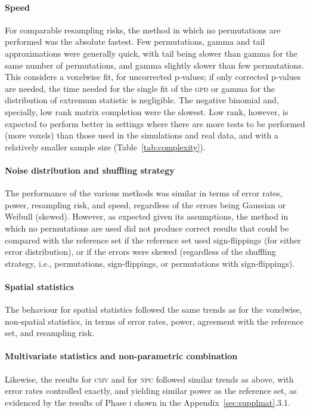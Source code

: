 \paragraph{Speed} For comparable resampling risks, the method in which no permutations are performed was the absolute fastest. Few permutations, gamma and tail approximations were generally quick, with tail being slower than gamma for the same number of permutations, and gamma slightly slower than few permutations. This considers a voxelwise fit, for uncorrected p-values; if only corrected p-values are needed, the time needed for the single fit of the \textsc{gpd} or gamma for the distribution of extremum statistic is negligible. The negative binomial and, specially, low rank matrix completion were the slowest. Low rank, however, is expected to perform better in settings where there are more tests to be performed (more voxels) than those used in the simulations and real data, and with a relatively smaller sample size (Table~\ref{tab:complexity}).

\paragraph{Noise distribution and shuffling strategy} The performance of the various methods was similar in terms of error rates, power, resampling risk, and speed, regardless of the errors being Gaussian or Weibull (skewed). However, as expected given its assumptions, the method in which no permutations are used did not produce correct results that could be compared with the reference set if the reference set used sign-flippings (for either error distribution), or if the errors were skewed (regardless of the shuffling strategy, i.e., permutations, sign-flippings, or permutations with sign-flippings).

\paragraph{Spatial statistics} The behaviour for spatial statistics followed the same trends as for the voxelwise, non-spatial statistics, in terms of error rates, power, agreement with the reference set, and resampling risk.

\paragraph{Multivariate statistics and non-parametric combination} Likewise, the results for \textsc{cmv} and for \textsc{npc} followed similar trends as above, with error rates controlled exactly, and yielding similar power as the reference set, as evidenced by the results of Phase \textsc{i} shown in the Appendix~\ref{sec:supplmat}.3.1.

